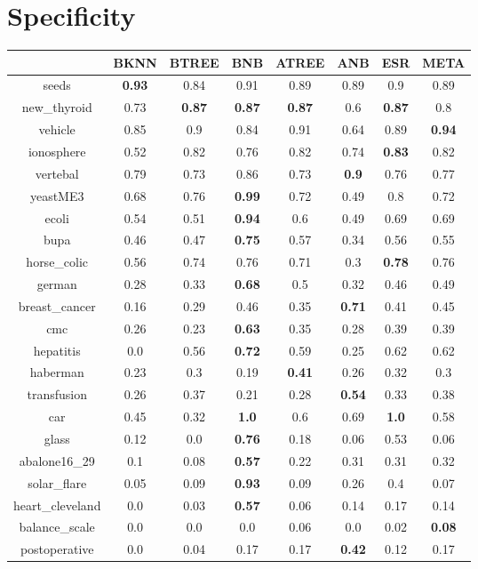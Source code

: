 \documentclass{article}%
\begin{document}
%
\section*{Specificity}%
\begin{tabular}{c|ccccccc}%
\hline%
&BKNN&BTREE&BNB&ATREE&ANB&ESR&META\\%
\hline%
seeds&\textbf{0.93}&0.84&0.91&0.89&0.89&0.9&0.89\\%
new\_thyroid&0.73&\textbf{0.87}&\textbf{0.87}&\textbf{0.87}&0.6&\textbf{0.87}&0.8\\%
vehicle&0.85&0.9&0.84&0.91&0.64&0.89&\textbf{0.94}\\%
ionosphere&0.52&0.82&0.76&0.82&0.74&\textbf{0.83}&0.82\\%
vertebal&0.79&0.73&0.86&0.73&\textbf{0.9}&0.76&0.77\\%
yeastME3&0.68&0.76&\textbf{0.99}&0.72&0.49&0.8&0.72\\%
ecoli&0.54&0.51&\textbf{0.94}&0.6&0.49&0.69&0.69\\%
bupa&0.46&0.47&\textbf{0.75}&0.57&0.34&0.56&0.55\\%
horse\_colic&0.56&0.74&0.76&0.71&0.3&\textbf{0.78}&0.76\\%
german&0.28&0.33&\textbf{0.68}&0.5&0.32&0.46&0.49\\%
breast\_cancer&0.16&0.29&0.46&0.35&\textbf{0.71}&0.41&0.45\\%
cmc&0.26&0.23&\textbf{0.63}&0.35&0.28&0.39&0.39\\%
hepatitis&0.0&0.56&\textbf{0.72}&0.59&0.25&0.62&0.62\\%
haberman&0.23&0.3&0.19&\textbf{0.41}&0.26&0.32&0.3\\%
transfusion&0.26&0.37&0.21&0.28&\textbf{0.54}&0.33&0.38\\%
car&0.45&0.32&\textbf{1.0}&0.6&0.69&\textbf{1.0}&0.58\\%
glass&0.12&0.0&\textbf{0.76}&0.18&0.06&0.53&0.06\\%
abalone16\_29&0.1&0.08&\textbf{0.57}&0.22&0.31&0.31&0.32\\%
solar\_flare&0.05&0.09&\textbf{0.93}&0.09&0.26&0.4&0.07\\%
heart\_cleveland&0.0&0.03&\textbf{0.57}&0.06&0.14&0.17&0.14\\%
balance\_scale&0.0&0.0&0.0&0.06&0.0&0.02&\textbf{0.08}\\%
postoperative&0.0&0.04&0.17&0.17&\textbf{0.42}&0.12&0.17\\%
\end{tabular}

%
\end{document}
